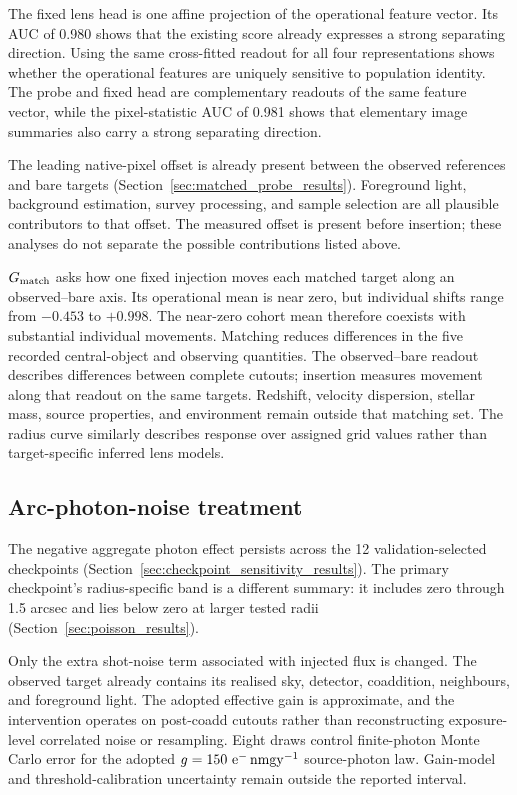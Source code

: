 The fixed lens head is one affine projection of the operational feature
vector. Its AUC of 0.980 shows that the existing score already expresses a
strong separating direction. Using the same cross-fitted readout for all four
representations shows whether the operational features are uniquely sensitive
to population identity. The probe and fixed head are complementary readouts
of the same feature vector, while the pixel-statistic AUC of 0.981 shows that
elementary image summaries also carry a strong separating direction.

The leading native-pixel offset is already present between the observed
references and bare targets (Section~\ref{sec:matched_probe_results}).
Foreground light, background estimation, survey processing, and sample
selection are all plausible contributors to that offset. The measured offset
is present before insertion; these analyses do not separate the possible
contributions listed above.

\(G_{\rm match}\) asks how one fixed injection moves each matched target along
an observed--bare axis. Its operational mean is near zero, but individual
shifts range from \(-0.453\) to \(+0.998\).
The near-zero cohort mean therefore coexists with substantial individual
movements. Matching reduces differences in the five recorded central-object
and observing quantities. The observed--bare readout describes differences
between complete cutouts; insertion measures movement along that readout on
the same targets. Redshift, velocity dispersion, stellar mass, source
properties, and environment remain outside that matching set. The radius
curve similarly describes response over assigned grid values rather than
target-specific inferred lens models.

\subsection{Arc-photon-noise treatment}
\label{sec:discussion_noise}

The negative aggregate photon effect persists across the 12
validation-selected checkpoints
(Section~\ref{sec:checkpoint_sensitivity_results}). The primary checkpoint's
radius-specific band is a different summary: it includes zero through
1.5 arcsec and lies below zero at larger tested radii
(Section~\ref{sec:poisson_results}).

Only the extra shot-noise term associated with injected flux is changed.
The observed target already contains its realised sky, detector, coaddition,
neighbours, and foreground light. The adopted effective gain is approximate,
and the intervention operates on post-coadd cutouts rather than reconstructing
exposure-level correlated noise or resampling. Eight draws control
finite-photon Monte Carlo error for the adopted
\(g=150\ {\rm e^{-}\,nmgy^{-1}}\) source-photon law. Gain-model and
threshold-calibration uncertainty remain outside the reported interval.

